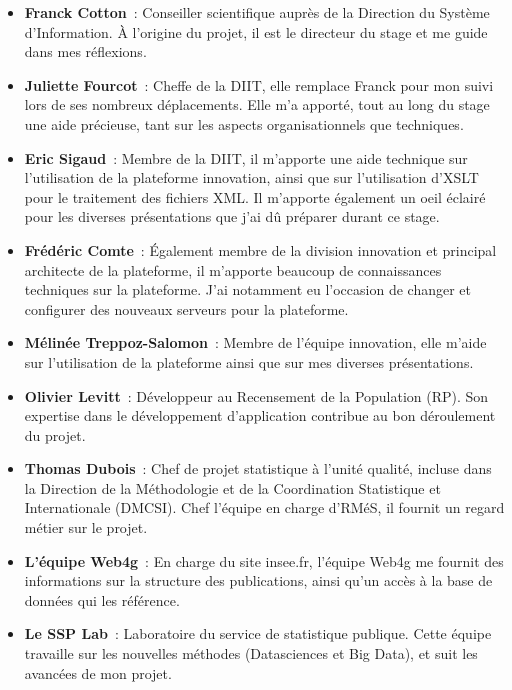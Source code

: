 \begin{itemize}
    \item \textbf{Franck Cotton}~: Conseiller scientifique auprès de la Direction du Système d'Information. À l'origine du projet, il est le directeur du stage et me guide dans mes réflexions.
    \vspace{5pt}
    \item \textbf{Juliette Fourcot}~: Cheffe de la DIIT, elle remplace Franck pour mon suivi lors de ses nombreux déplacements. Elle m'a apporté, tout au long du stage une aide précieuse, tant sur les aspects organisationnels que techniques.
    \vspace{5pt}
    \item \textbf{Eric Sigaud}~: Membre de la DIIT, il m'apporte une aide technique sur l'utilisation de la plateforme innovation, ainsi que sur l'utilisation d'XSLT pour le traitement des fichiers XML. Il m'apporte également un oeil éclairé pour les diverses présentations que j'ai dû préparer durant ce stage.
    \vspace{5pt}
    \item \textbf{Frédéric Comte}~: Également membre de la division innovation et principal architecte de la plateforme, il m'apporte beaucoup de connaissances techniques sur la plateforme. J'ai notamment eu l'occasion de changer et configurer des nouveaux serveurs pour la plateforme.
    \vspace{5pt}
    \item \textbf{Mélinée Treppoz-Salomon}~: Membre de l'équipe innovation, elle m'aide sur l'utilisation de la plateforme ainsi que sur mes diverses présentations.
    \vspace{5pt}
    \item \textbf{Olivier Levitt}~: Développeur au Recensement de la Population (RP). Son expertise dans le développement d'application contribue au bon déroulement du projet.
    \vspace{5pt}
    \item \textbf{Thomas Dubois}~: Chef de projet statistique à l'unité qualité, incluse dans la Direction de la Méthodologie et de la Coordination Statistique et Internationale (DMCSI). Chef l'équipe en charge d'RMéS, il fournit un regard métier sur le projet.
    \vspace{5pt}
    \item \textbf{L'équipe Web4g}~: En charge du site insee.fr, l'équipe Web4g me fournit des informations sur la structure des publications, ainsi qu'un accès à la base de données qui les référence.%
    \vspace{5pt}
    \item \textbf{Le SSP Lab}~: Laboratoire du service de statistique publique. Cette équipe travaille sur les nouvelles méthodes (Datasciences et Big Data), et suit les avancées de mon projet.
    \newline
\end{itemize}

